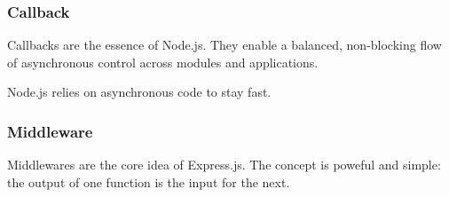 \subsubsection{Callback}
Callbacks are the essence of Node.js.
They enable a balanced, non-blocking flow of asynchronous control across modules and applications.

Node.js relies on asynchronous code to stay fast.

\subsubsection{Middleware}
Middlewares are the core idea of Express.js.
The concept is poweful and simple: the output of one function is the input for the next.



